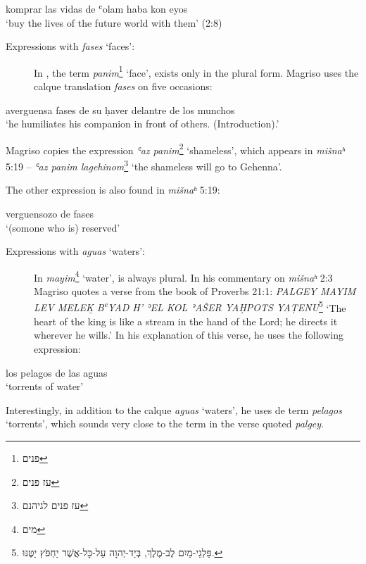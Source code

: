 \documentclass[output=paper,colorlinks,citecolor=brown,babel,arabicfont]{langscibook}
\begin{document}
\ea\label{ch3.7.ex.n20}
komprar las vidas de {ʿolam haba} kon eyos \\
`buy the lives of the future world with them' (2:8)
\z

\begin{description}

\item[Expressions with \textit{fases} `faces':]

In , the term \textit{panim}\footnote{\texthebrew{פנים}} `face', exists only in the plural form. Magriso uses the calque translation \textit{fases} on five occasions:
\end{description}

\ea\label{ch3.7.ex.n21}
averguensa  fases de su ḥaver delantre de los munchos \\
`he humiliates his companion in front of others. (Introduction).'
\z

Magriso copies the  expression \textit{ʿaz panim}\footnote{\texthebrew{עז פנים}} `shameless', which appears in \textit{mišnaʰ} 5:19 -- \textit{ʿaz panim lagehinom}\footnote{\texthebrew{עז פנים לגיהנם}} `the shameless will go to Gehenna'.

The other expression is also found in \textit{mišnaʰ} 5:19:

\ea\label{ch3.7.ex.n22}
verguensozo de fases \\
`(somone who is) reserved'
\z

\begin{description}

\item[Expressions with \textit{aguas} `waters':]

In  \textit{mayim}\footnote{\texthebrew{מים}} `water', is always plural. In his commentary on \textit{mišnaʰ} 2:3 Magriso quotes a verse from the book of Proverbs 21:1: \textit{PALGEY MAYIM LEV MELE\b{K} B\textsuperscript{e}YAD H' ʾEL KOL ʾAŠER YAḤPOTS YAṬENU}\footnote{\texthebrew{פַּלְגֵי-מַיִם לֶב-מֶלֶךְ, בְּיַד-יְהוָה עַל-כָּל-אֲשֶׁר יַחְפֹּץ יַטֶּנּוּ.}} `The heart of the king is like a stream in the hand of the Lord; he directs it wherever he wills.' In his explanation of this verse, he uses the following expression:
\end{description}

\ea\label{ch3.7.ex.n23}
los pelagos de las aguas \\
`torrents of water'
\z

Interestingly, in addition to the calque \textit{aguas} `waters', he uses de term \textit{pelagos} `torrents', which sounds very close to the  term in the verse quoted \textit{palgey}. 
\end{document}

